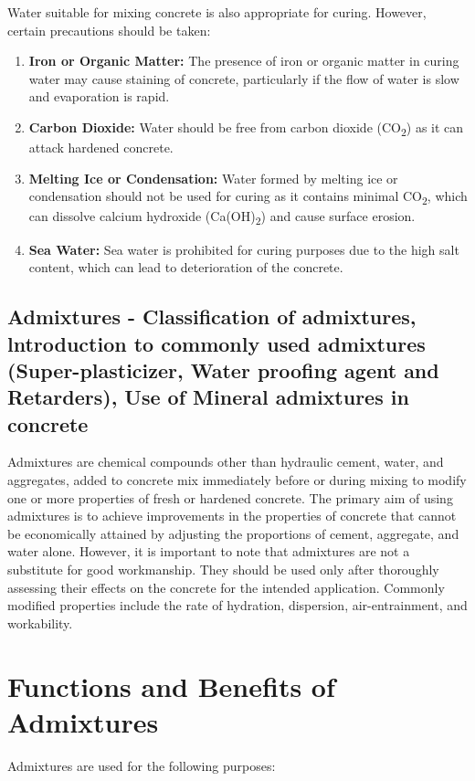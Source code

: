 \documentclass[a4paper,11pt]{book}
\begin{document}
Water suitable for mixing concrete is also appropriate for curing. However, certain precautions should be taken:

\begin{enumerate}
    \item \textbf{Iron or Organic Matter:} The presence of iron or organic matter in curing water may cause staining of concrete, particularly if the flow of water is slow and evaporation is rapid.
    \item \textbf{Carbon Dioxide:} Water should be free from carbon dioxide (CO\textsubscript{2}) as it can attack hardened concrete.
    \item \textbf{Melting Ice or Condensation:} Water formed by melting ice or condensation should not be used for curing as it contains minimal CO\textsubscript{2}, which can dissolve calcium hydroxide (Ca(OH)\textsubscript{2}) and cause surface erosion.
    \item \textbf{Sea Water:} Sea water is prohibited for curing purposes due to the high salt content, which can lead to deterioration of the concrete.
\end{enumerate}
\subsection{Admixtures - Classification of
admixtures, lntroduction to commonly used
admixtures (Super-plasticizer, Water
proofing agent and Retarders), Use of
Mineral admixtures in concrete}
Admixtures are chemical compounds other than hydraulic cement, water, and aggregates, added to concrete mix immediately before or during mixing to modify one or more properties of fresh or hardened concrete. The primary aim of using admixtures is to achieve improvements in the properties of concrete that cannot be economically attained by adjusting the proportions of cement, aggregate, and water alone. However, it is important to note that admixtures are not a substitute for good workmanship. They should be used only after thoroughly assessing their effects on the concrete for the intended application. Commonly modified properties include the rate of hydration, dispersion, air-entrainment, and workability.

\section*{Functions and Benefits of Admixtures}

Admixtures are used for the following purposes:
\end{document}

